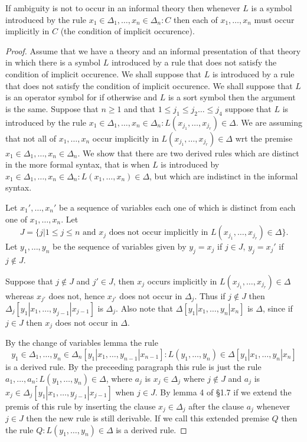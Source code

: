 \begin{lemma}
  If ambiguity is not to occur in an informal theory then whenever $L$ is a symbol introduced by the rule $x_1\in\Delta_1,\ldots,x_n\in\Delta_n:C$ then each of $x_1,\ldots,x_n$ must occur implicitly in $C$ (the condition of implicit occurence).
\end{lemma}
\begin{proof}
  Assume that we have a theory and an informal presentation of that theory in which there is a symbol $L$ introduced by a rule that does not satisfy the condition of implicit occurence.
  We shall suppose that $L$ is introduced by a rule that does not satisfy the condition of implicit occurence.
  We shall suppose that $L$ is an operator symbol for if otherwise and $L$ is a sort symbol then the argument is the same.
  Suppose that $n\geq 1$ and that $1\leq j_1\leq j_2\ldots\leq j_4$ suppose that $L$ is introduced by the rule $x_1\in\Delta_1,\ldots,x_n\in\Delta_n:L(x_{j_1},\ldots,x_{j_r})\in\Delta$.
  We are assuming that not all of $x_1,\ldots,x_n$ occur implicitly in $L(x_{j_1},\ldots,x_{j_r})\in\Delta$ wrt the premise $x_1\in\Delta_1,\ldots,x_n\in\Delta_n$.
  We show that there are two derived rules which are distinct in the more formal syntax, that is when $L$ is introduced by $x_1\in\Delta_1,\ldots,x_n\in\Delta_n:L(x_1,\ldots,x_n)\in\Delta$, but which are indistinct in the informal syntax.

  Let $x_1',\ldots,x_n'$ be a sequence of variables each one of which is distinct from each one of $x_1,\ldots,x_n$.
  Let
  \[J=\{j|1\leq j\leq n \text{ and $x_j$ does not occur implicitly in $L(x_{j_1},\ldots,x_{j_r})\in\Delta$}\}.\]
  Let $y_1,\ldots, y_n$ be the sequence of variables given by $y_j=x_j$ if $j\in J$, $y_j=x_j'$ if $j\not\in J$.

  Suppose that $j\not\in J$ and $j'\in J$, then $x_j$ occurs implicitly in $L(x_{j_1},\ldots,x_{j_r})\in\Delta$ whereas $x_{j'}$ does not, hence $x_{j'}$ does not occur in $\Delta_j$.
  Thus if $j\not\in J$ then $\Delta_j[y_1|x_1,\ldots,y_{j-1}|x_{j-1}]$ is $\Delta_j$.
  Also note that $\Delta[y_1|x_1,\ldots,y_n|x_n]$ is $\Delta$, since if $j\in J$ then $x_j$ does not occur in $\Delta$.

  By the change of variables lemma the rule
  \[y_1\in\Delta_1,\ldots,y_n\in\Delta_n[y_1|x_1,\ldots,y_{n-1}|x_{n-1}] : L(y_1,\ldots,y_n) \in\Delta[y_1|x_1,\ldots, y_n|x_n]\] is a derived rule.
  By the preceeding paragraph this rule is just the rule $a_1,\ldots,a_n:L(y_1,\ldots,y_n)\in\Delta$, where $a_j$ is $x_j\in\Delta_j$ where $j\not\in J$ and $a_j$ is $x_j\in\Delta_j[y_1|x_1,\ldots,y_{j-1}|x_{j-1}]$ when $j\in J$.
  By lemma 4 of \S 1.7 if we extend the premis of this rule by inserting the clause $x_j\in\Delta_j$ after the clause $a_j$ whenever $j\in J$ then the new rule is still derivable.
  If we call this extended premise $Q$ then the rule $Q:L(y_1,\ldots,y_n)\in\Delta$ is a derived rule.


\end{proof}
